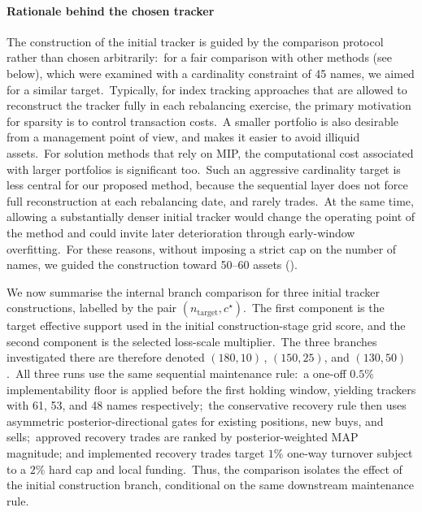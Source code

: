 \documentclass[11pt]{article}
\begin{document}
\paragraph{Rationale behind the chosen tracker}

The construction of the initial tracker is guided by the comparison protocol rather than chosen arbitrarily:\ for a fair comparison with other methods (see below), which were examined with a cardinality constraint of 45 names, we aimed for a similar target.\ Typically, for index tracking approaches that are allowed to reconstruct the tracker fully in each rebalancing exercise, the primary motivation for sparsity is to control transaction costs.\ A smaller portfolio is also desirable from a management point of view, and makes it easier to avoid illiquid assets.\ For solution methods that rely on MIP, the computational cost associated with larger portfolios is significant too.\ Such an aggressive cardinality target is less central for our proposed method, because the sequential layer does not force full reconstruction at each rebalancing date, and rarely trades.\ At the same time, allowing a substantially denser initial tracker would change the operating point of the method and could invite later deterioration through early-window overfitting.\ For these reasons, without imposing a strict cap on the number of names, we guided the construction toward 50--60 assets ().

We now summarise the internal branch comparison for three initial tracker constructions, labelled by the pair
\((n_{\mathrm{target}},c^\star)\).\ The first component is the target effective support used in the initial construction-stage grid score, and the second component is the selected loss-scale multiplier.\ The three branches investigated there are therefore denoted
\((180,10)\,\), \((150,25)\), and \((130,50)\).\ All three runs use the same sequential maintenance rule:\ a one-off \(0.5\%\) implementability floor is applied before the first holding window, yielding trackers with 61, 53, and 48 names respectively;\ the conservative recovery rule then uses asymmetric posterior-directional gates for existing positions, new buys, and sells;\ approved recovery trades are ranked by posterior-weighted MAP magnitude; and implemented recovery trades target \(1\%\) one-way turnover subject to a \(2\%\) hard cap and local funding.\ Thus, the comparison isolates the effect of the initial construction branch, conditional on the same downstream maintenance rule.
\end{document}
